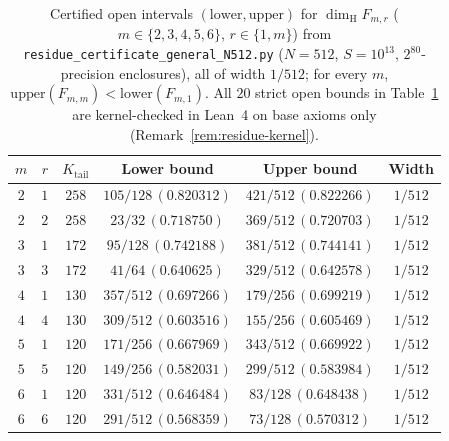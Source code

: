 \documentclass[11pt]{article}
\theoremstyle{definition}
\theoremstyle{remark}
\newcommand{\dimH}{\dim_{\mathrm{H}}}
\begin{document}
\begin{table}[ht]
\centering\small
\begin{tabular}{c|c|c|c|c|c}
$m$ & $r$ & $K_{\mathrm{tail}}$ & Lower bound & Upper bound & Width \\\hline
$2$ & $1$ & $258$ & $105/128\,(0.820312)$ & $421/512\,(0.822266)$ & $1/512$ \\
$2$ & $2$ & $258$ & $23/32\,(0.718750)$ & $369/512\,(0.720703)$ & $1/512$ \\\hline
$3$ & $1$ & $172$ & $95/128\,(0.742188)$ & $381/512\,(0.744141)$ & $1/512$ \\
$3$ & $3$ & $172$ & $41/64\,(0.640625)$ & $329/512\,(0.642578)$ & $1/512$ \\\hline
$4$ & $1$ & $130$ & $357/512\,(0.697266)$ & $179/256\,(0.699219)$ & $1/512$ \\
$4$ & $4$ & $130$ & $309/512\,(0.603516)$ & $155/256\,(0.605469)$ & $1/512$ \\\hline
$5$ & $1$ & $120$ & $171/256\,(0.667969)$ & $343/512\,(0.669922)$ & $1/512$ \\
$5$ & $5$ & $120$ & $149/256\,(0.582031)$ & $299/512\,(0.583984)$ & $1/512$ \\\hline
$6$ & $1$ & $120$ & $331/512\,(0.646484)$ & $83/128\,(0.648438)$ & $1/512$ \\
$6$ & $6$ & $120$ & $291/512\,(0.568359)$ & $73/128\,(0.570312)$ & $1/512$
\end{tabular}
\caption{Certified open intervals $(\mathrm{lower},\mathrm{upper})$ for $\dimH F_{m,r}$ ($m\in\{2,3,4,5,6\}$, $r\in\{1,m\}$) from \texttt{residue\_\allowbreak certificate\_\allowbreak general\_\allowbreak N512.py} ($N=512$, $S=10^{13}$, $2^{80}$-precision enclosures), all of width $1/512$; for every $m$, $\mathrm{upper}(F_{m,m})<\mathrm{lower}(F_{m,1})$. All $20$ strict open bounds in Table~\ref{tab:residues-general} are kernel-checked in Lean~4 on base axioms only (Remark~\ref{rem:residue-kernel}).}\label{tab:residues-general}
\end{table}
\end{document}
